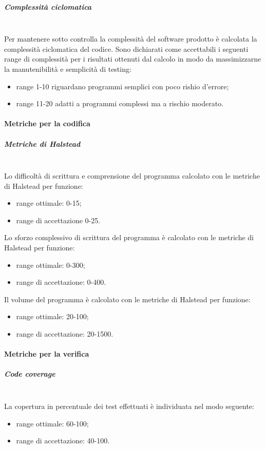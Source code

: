 \subparagraph{Complessità ciclomatica}\mbox{}\\
Per mantenere sotto controlla la complessità del software prodotto è calcolata la complessità ciclomatica del codice. 
Sono dichiarati come accettabili i seguenti range di complessità per i risultati ottenuti dal calcolo in modo da massimizzarne la manutenibilità e semplicità di testing: 
\begin{itemize}
	\item range 1-10 riguardano programmi semplici con poco rishio d'errore;
	\item range 11-20 adatti a programmi complessi ma a rischio moderato.
\end{itemize}

\paragraph{Metriche per la codifica}\mbox{}
\subparagraph{Metriche di Halstead}\mbox{}\\

Lo difficoltà di scrittura e comprensione del programma calcolato con le metriche di Halstead per funzione:
\begin{itemize}
	\item range ottimale: 0-15;
	\item range di accettazione 0-25.
\end{itemize}

Lo sforzo complessivo di scrittura del programma è calcolato con le metriche di Halstead per funzione:
\begin{itemize}
	\item range ottimale: 0-300;
	\item range di accettazione: 0-400.
\end{itemize}

Il volume del programma è calcolato con le metriche di Halstead per funzione:
\begin{itemize}
	\item range ottimale: 20-100;
	\item range di accettazione: 20-1500.
\end{itemize}

\paragraph{Metriche per la verifica}\mbox{}
\subparagraph{Code coverage}\mbox{}\\
La copertura in percentuale dei test effettuati è individuata nel modo seguente:
\begin{itemize}
	\item range ottimale: 60-100;
	\item range di accettazione: 40-100.
\end{itemize}

